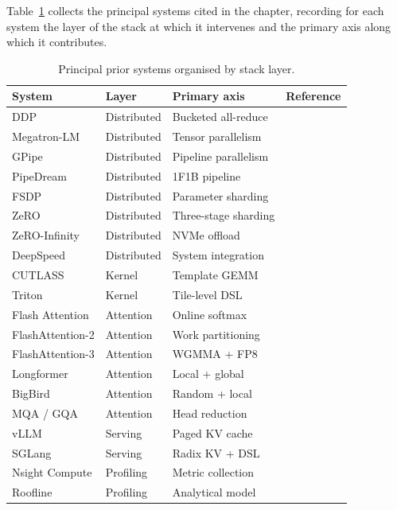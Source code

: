 Table~\ref{tab:lit_summary} collects the principal systems cited in
the chapter, recording for each system the layer of the stack at
which it intervenes and the primary axis along which it contributes.

\begin{table}[h]
\centering
\caption{Principal prior systems organised by stack layer.}
\label{tab:lit_summary}
\begin{tabular}{lllc}
\toprule
\textbf{System} & \textbf{Layer} & \textbf{Primary axis} & \textbf{Reference} \\
\midrule
DDP              & Distributed & Bucketed all-reduce  & \cite{li2020pytorch} \\
Megatron-LM      & Distributed & Tensor parallelism    & \cite{shoeybi2019megatron} \\
GPipe            & Distributed & Pipeline parallelism  & \cite{huang2019gpipe} \\
PipeDream        & Distributed & 1F1B pipeline         & \cite{harlap2018pipedream} \\
FSDP             & Distributed & Parameter sharding    & \cite{zhao2023pytorch} \\
ZeRO             & Distributed & Three-stage sharding  & \cite{rajbhandari2019zero} \\
ZeRO-Infinity    & Distributed & NVMe offload          & \cite{rajbhandari2021zero} \\
DeepSpeed        & Distributed & System integration    & \cite{rasley2020deepspeed} \\
CUTLASS          & Kernel      & Template GEMM         & \cite{cutlass} \\
Triton           & Kernel      & Tile-level DSL        & \cite{tillet2019triton} \\
Flash Attention  & Attention   & Online softmax        & \cite{dao2022flashattention} \\
FlashAttention-2 & Attention   & Work partitioning     & \cite{dao2023flashattention2} \\
FlashAttention-3 & Attention   & WGMMA + FP8           & \cite{dao2024flashattention3} \\
Longformer       & Attention   & Local + global        & \cite{beltagy2020longformer} \\
BigBird          & Attention   & Random + local        & \cite{zaheer2020bigbird} \\
MQA / GQA        & Attention   & Head reduction        & \cite{shazeer2019mqa,ainslie2023gqa} \\
vLLM             & Serving     & Paged KV cache        & \cite{vllm} \\
SGLang           & Serving     & Radix KV + DSL        & \cite{sglang} \\
Nsight Compute   & Profiling   & Metric collection     & \cite{nsight} \\
Roofline         & Profiling   & Analytical model      & \cite{williams2009roofline} \\
\bottomrule
\end{tabular}
\end{table}
